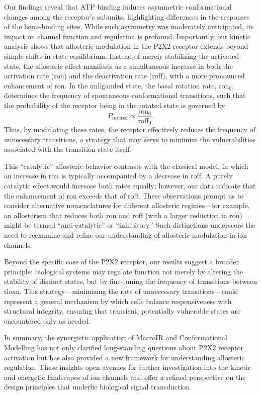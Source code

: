 \documentclass[pdflatex,sn-mathphys-num]{sn-jnl}%
\theoremstyle{thmstyleone}%
\theoremstyle{thmstyletwo}%
\theoremstyle{thmstylethree}%
\begin{document}
Our findings reveal that ATP binding induces asymmetric conformational changes among the receptor’s subunits, highlighting differences in the responses of the hemi-binding sites. While such asymmetry was moderately anticipated, its impact on channel function and regulation is profound. Importantly, our kinetic analysis shows that allosteric modulation in the P2X2 receptor extends beyond simple shifts in state equilibrium. Instead of merely stabilizing the activated state, the allosteric effect manifests as a simultaneous increase in both the activation rate ($\mathrm{ron}$) and the deactivation rate ($\mathrm{roff}$), with a more pronounced enhancement of $\mathrm{ron}$. In the unliganded state, the basal rotation rate, $\mathrm{ron}_0$, determines the frequency of spontaneous conformational transitions, such that the probability of the receptor being in the rotated state is governed by
\[
P_{\text{rotated}} \propto \frac{\mathrm{ron}_0}{\mathrm{roff}_0}.
\]
Thus, by modulating these rates, the receptor effectively reduces the frequency of unnecessary transitions, a strategy that may serve to minimize the vulnerabilities associated with the transition state itself.

This “catalytic” allosteric behavior contrasts with the classical model, in which an increase in $\mathrm{ron}$ is typically accompanied by a decrease in $\mathrm{roff}$. A purely catalytic effect would increase both rates equally; however, our data indicate that the enhancement of $\mathrm{ron}$ exceeds that of $\mathrm{roff}$. These observations prompt us to consider alternative nomenclatures for different allosteric regimes—for example, an allosterism that reduces both $\mathrm{ron}$ and $\mathrm{roff}$ (with a larger reduction in $\mathrm{ron}$) might be termed “anti-catalytic” or “inhibitory.” Such distinctions underscore the need to reexamine and refine our understanding of allosteric modulation in ion channels.

Beyond the specific case of the P2X2 receptor, our results suggest a broader principle: biological systems may regulate function not merely by altering the stability of distinct states, but by fine-tuning the frequency of transitions between them. This strategy—minimizing the rate of unnecessary transitions—could represent a general mechanism by which cells balance responsiveness with structural integrity, ensuring that transient, potentially vulnerable states are encountered only as needed.

In summary, the synergistic application of MacroIR and Conformational Modelling has not only clarified long-standing questions about P2X2 receptor activation but has also provided a new framework for understanding allosteric regulation. These insights open avenues for further investigation into the kinetic and energetic landscapes of ion channels and offer a refined perspective on the design principles that underlie biological signal transduction.
\end{document}

